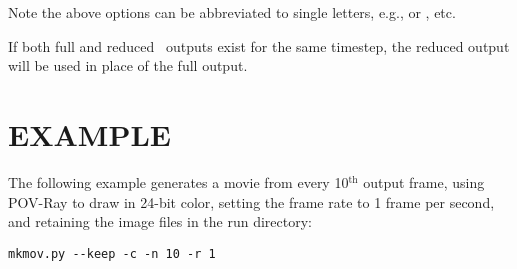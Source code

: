 Note the above options can be abbreviated to single letters, e.g.,
 or {}, etc.

If both full and reduced \pkd\ outputs exist for the same timestep,
the reduced output will be used in place of the full output.

\section{EXAMPLE}

The following example generates a movie from every 10$^{\mathrm{th}}$
output frame, using POV-Ray to draw in 24-bit color, setting the frame
rate to 1 frame per second, and retaining the image files in the run
directory:

\begin{verbatim}
mkmov.py --keep -c -n 10 -r 1
\end{verbatim}


